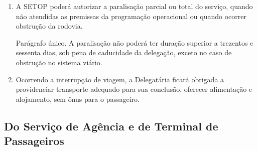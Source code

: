 \begin{enumerate}[resume, label=Art. \arabic*]

\item A SETOP poderá autorizar a paralisação parcial ou total do serviço, quando não atendidas as premissas da programação operacional ou quando ocorrer obstrução da rodovia.

Parágrafo único. A paralisação não poderá ter duração superior a trezentos e sessenta dias, sob pena de caducidade da delegação, exceto no caso de obstrução no sistema viário.

\item  Ocorrendo a interrupção de viagem, a Delegatária ficará obrigada a providenciar transporte adequado para sua conclusão, oferecer alimentação e alojamento, sem ônus para o passageiro.

\end{enumerate}

\subsection{Do Serviço de Agência e de Terminal de Passageiros}

